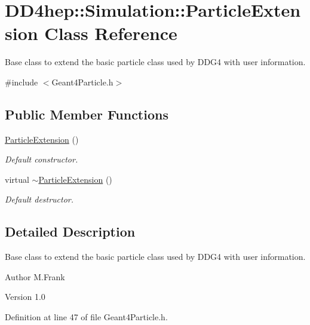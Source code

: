 \hypertarget{class_d_d4hep_1_1_simulation_1_1_particle_extension}{
\section{DD4hep::Simulation::ParticleExtension Class Reference}
\label{class_d_d4hep_1_1_simulation_1_1_particle_extension}
}


Base class to extend the basic particle class used by DDG4 with user information.  


{\ttfamily \#include $<$Geant4Particle.h$>$}\subsection*{Public Member Functions}
\begin{DoxyCompactItemize}
\item 
\hyperlink{class_d_d4hep_1_1_simulation_1_1_particle_extension_a6bd53f39e129dedd6a17a7e60c0c03af}{ParticleExtension} ()
\begin{DoxyCompactList}\small\item\em Default constructor. \item\end{DoxyCompactList}\item 
virtual \hyperlink{class_d_d4hep_1_1_simulation_1_1_particle_extension_aed2fb52f3a28221b701ab44dee8ed576}{$\sim$ParticleExtension} ()
\begin{DoxyCompactList}\small\item\em Default destructor. \item\end{DoxyCompactList}\end{DoxyCompactItemize}


\subsection{Detailed Description}
Base class to extend the basic particle class used by DDG4 with user information. \begin{DoxyAuthor}{Author}
M.Frank 
\end{DoxyAuthor}
\begin{DoxyVersion}{Version}
1.0 
\end{DoxyVersion}


Definition at line 47 of file Geant4Particle.h.

